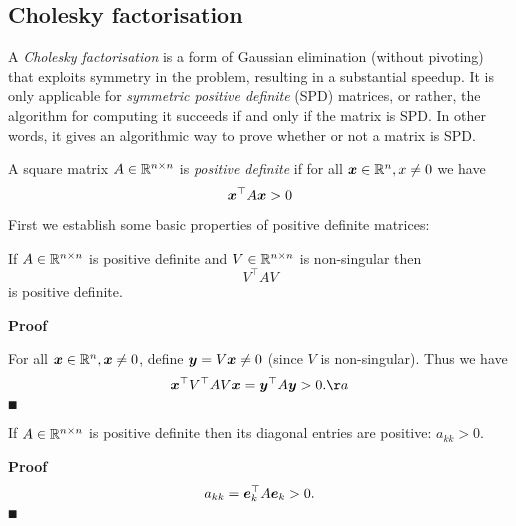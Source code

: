 \subsection{Cholesky factorisation}
A \emph{Cholesky factorisation} is a form of Gaussian elimination (without pivoting) that exploits symmetry in the problem, resulting in a substantial speedup. It is only applicable for \emph{symmetric positive definite} (SPD) matrices, or rather, the algorithm for computing it succeeds if and only if the matrix is SPD. In other words, it gives an algorithmic way to prove whether or not a matrix is SPD.

\begin{definition} A square matrix $A \in {\mathbb R}^{n \times n}$ is \emph{positive definite} if for all $\bm{{\mbox{\boldmath$x$\unboldmath}}} \in {\mathbb R}^n, x \neq 0$ we have
\[
\bm{{\mbox{\boldmath$x$\unboldmath}}}^\top A \bm{{\mbox{\boldmath$x$\unboldmath}}} > 0
\]
\end{definition}

First we establish some basic properties of positive definite matrices:

\begin{proposition} If  $A \in {\mathbb R}^{n \times n}$ is positive definite and $V \in {\mathbb R}^{n \times n}$ is non-singular then
\[
V^\ensuremath{\top} A V
\]
is positive definite. \end{proposition}
\textbf{Proof}

For all  $\bm{{\mbox{\boldmath$x$\unboldmath}}} \in {\mathbb R}^n, \bm{{\mbox{\boldmath$x$\unboldmath}}} \neq 0$, define $\bm{{\mbox{\boldmath$y$\unboldmath}}} = V \bm{{\mbox{\boldmath$x$\unboldmath}}} \neq 0$ (since $V$ is non-singular). Thus we have
\[
\ensuremath{\bm{\x}}^\ensuremath{\top} V^\ensuremath{\top} A V \ensuremath{\bm{\x}} = \ensuremath{\bm{\y}}^\ensuremath{\top} A \ensuremath{\bm{\y}} > 0.\ensuremath{\aa}
\]
\ensuremath{\QED}

\begin{proposition} If $A \in {\mathbb R}^{n \times n}$ is positive definite then its diagonal entries are positive: $a_{kk} > 0$. \end{proposition}
\textbf{Proof}
\[
a_{kk} = \bm{{\mbox{\boldmath$e$\unboldmath}}}_k^\top A \bm{{\mbox{\boldmath$e$\unboldmath}}}_k > 0.
\]
\ensuremath{\QED}

